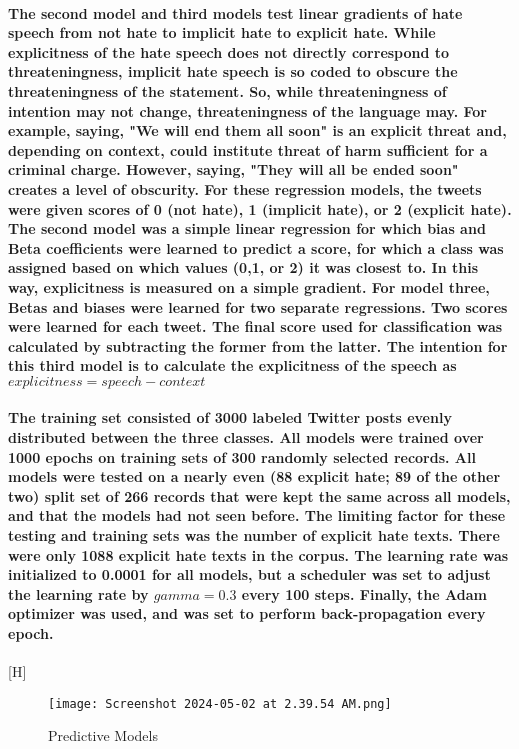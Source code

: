 \documentclass{article}
\begin{document}
\paragraph{The second model and third models test linear gradients of hate speech from not hate to implicit hate to explicit hate. While explicitness of the hate speech does not directly correspond to threateningness, implicit hate speech is so coded to obscure the threateningness of the statement. So, while threateningness of intention may not change, threateningness of the language may. For example, saying, "We will end them all soon" is an explicit threat and, depending on context, could institute threat of harm sufficient for a criminal charge. However, saying, "They will all be ended soon" creates a level of obscurity. For these regression models, the tweets were given scores of 0 (not hate), 1 (implicit hate), or 2 (explicit hate). The second model was a simple linear regression for which bias and Beta coefficients were learned to predict a score, for which a class was assigned based on which values (0,1, or 2) it was closest to. In this way, explicitness is measured on a simple  gradient. For model three, Betas and biases were learned for two separate regressions. Two scores were learned for each tweet. The final score used for classification was calculated by subtracting the former from the latter. The intention for this third model is to calculate the explicitness of the speech as $explicitness=speech-context$}
\paragraph{The training set consisted of 3000 labeled Twitter posts evenly distributed between the three classes. All models were trained over 1000 epochs on training sets of 300 randomly selected records. All models were tested on a nearly even (88 explicit hate; 89 of the other two) split set of 266 records that were kept the same across all models, and that the models had not seen before. The limiting factor for these testing and training sets was the number of explicit hate texts. There were only 1088 explicit hate texts in the corpus. The learning rate was initialized to 0.0001 for all models, but a scheduler was set to adjust the learning rate by $gamma = 0.3$ every 100 steps. Finally, the Adam optimizer was used, and was set to perform back-propagation every epoch.}[H]
\begin{figure}[H]
        \texttt{[image: Screenshot 2024-05-02 at 2.39.54 AM.png]}
        \caption{Predictive Models}
        \label{fig:enter-label}
\end{figure}
\end{document}
